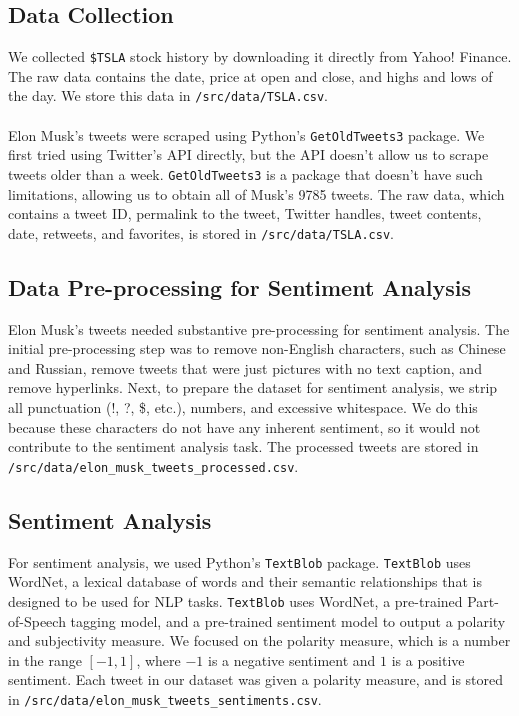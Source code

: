 \documentclass[12pt, notitlepage]{article}
\begin{document}
\subsection{Data Collection}
We collected \texttt{\$TSLA} stock history by downloading it directly from Yahoo! Finance. The raw data contains the date, price at open and close, and highs and lows of the day. We store this data in \texttt{/src/data/TSLA.csv}. \\\\
Elon Musk's tweets were scraped using Python's \texttt{GetOldTweets3} package. We first tried using Twitter's API directly, but the API doesn't allow us to scrape tweets older than a week. \texttt{GetOldTweets3} is a package that doesn't have such limitations, allowing us to obtain all of Musk's 9785 tweets. The raw data, which contains a tweet ID, permalink to the tweet, Twitter handles, tweet contents, date, retweets, and favorites, is stored in \texttt{/src/data/TSLA.csv}.

\subsection{Data Pre-processing for Sentiment Analysis}
Elon Musk's tweets needed substantive pre-processing for sentiment analysis. The initial pre-processing step was to remove non-English characters, such as Chinese and Russian, remove tweets that were just pictures with no text caption, and remove hyperlinks. Next, to prepare the dataset for sentiment analysis, we strip all punctuation (!, ?, \$, etc.), numbers, and excessive whitespace. We do this because these characters do not have any inherent sentiment, so it would not contribute to the sentiment analysis task. The processed tweets are stored in \texttt{/src/data/elon\_musk\_tweets\_processed.csv}.

\subsection{Sentiment Analysis}
For sentiment analysis, we used Python's \texttt{TextBlob} package. \texttt{TextBlob} uses WordNet, a lexical database of words and their semantic relationships that is designed to be used for NLP tasks. \texttt{TextBlob} uses WordNet, a pre-trained Part-of-Speech tagging model, and a pre-trained sentiment model to output a polarity and subjectivity measure. We focused on the polarity measure, which is a number in the range $[-1,1]$, where $-1$ is a negative sentiment and $1$ is a positive sentiment. Each tweet in our dataset was given a polarity measure, and is stored in \texttt{/src/data/elon\_musk\_tweets\_sentiments.csv}.
\end{document}
